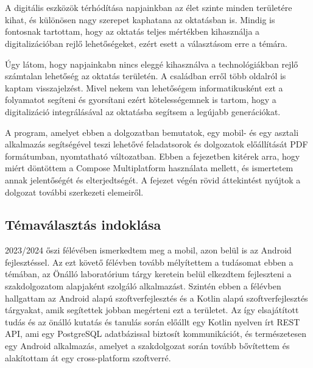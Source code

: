 \chapter{\bevezetes}

A digitális eszközök térhódítása napjainkban az élet szinte minden területére kihat, és különösen nagy szerepet kaphatana az oktatásban is.
Mindig is fontosnak tartottam, hogy az oktatás teljes mértékben kihasználja a digitalizációban rejlő lehetőségeket, ezért esett a választásom erre a témára.

Úgy látom, hogy napjainkabn nincs eleggé kihasználva a technológiákban rejlő számtalan lehetőség az oktatás területén.
A családban erről több oldalról is kaptam visszajelzést.
Mivel nekem van lehetőségem informatikusként ezt a folyamatot segíteni és gyorsítani ezért kötelességemnek is tartom, hogy a digitalizáció integrálásával az oktatásba segítsem a legújabb generációkat.

A program, amelyet ebben a dolgozatban bemutatok, egy mobil- és egy asztali alkalmazás segítségével teszi lehetővé feladatsorok és dolgozatok előállítását PDF formátumban, nyomtatható változatban. Ebben a fejezetben kitérek arra, hogy miért döntöttem a Compose Multiplatform használata mellett, és ismertetem annak jelentőségét és elterjedtségét.
A fejezet végén rövid áttekintést nyújtok a dolgozat további szerkezeti elemeiről.

\section{Témaválasztás indoklása}

2023/2024 őszi félévében ismerkedtem meg a mobil, azon belül is az Android fejlesztéssel.
Az ezt követő félévben tovább mélyítettem a tudásomat ebben a témában, az Önálló laboratórium tárgy keretein belül elkezdtem fejleszteni a szakdolgozatom alapjaként szolgáló alkalmazást.
Szintén ebben a félévben hallgattam az Android alapú szoftverfejlesztés és a Kotlin alapú szoftverfejlesztés tárgyakat, amik segítettek jobban megérteni ezt a területet.
Az így elsajátított tudás és az önálló kutatás és tanulás során előállt egy Kotlin nyelven írt REST API, ami egy PostgreSQL adatbázissal biztosít kommunikációt, és természetesen egy Android alkalmazás, amelyet a szakdolgozat során tovább bővítettem és alakítottam át egy cross-platform szoftverré.

